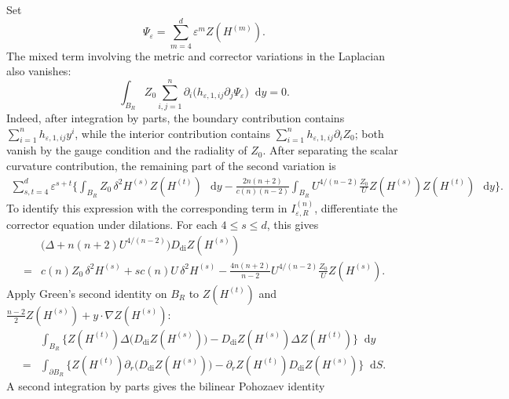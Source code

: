 \documentclass[11pt]{article}
\numberwithin{equation}{section}
\theoremstyle{remark}
\newcommand{\dd}{\mathop{}\!\mathrm{d}}
\begin{document}
 Set
 {
\[
 \Psi_\varepsilon=\sum_{m=4}^d
 \varepsilon^m Z(H^{(m)}).
\]
}
The mixed term involving the metric and corrector
variations in the Laplacian also vanishes:
{
\begin{equation*}
 \int_{B_R}Z_0\sum_{i,j=1}^n\partial_i
 \bigl(h_{\varepsilon,1,ij}\partial_j\Psi_\varepsilon\bigr)\dd y=0.
\end{equation*}
}
 Indeed, after integration by parts,
the boundary contribution contains
$\sum_{i=1}^nh_{\varepsilon,1,ij}y^i$, while the interior contribution
contains $\sum_{i=1}^nh_{\varepsilon,1,ij}\partial_iZ_0$; both vanish by
the gauge condition and the radiality of $Z_0$.  After separating the
scalar curvature contribution, the remaining part of the second
variation is
{
\begin{equation*}
\begin{aligned}
 \sum_{s,t=4}^d\varepsilon^{s+t}\biggl\{
 \int_{B_R}Z_0\,\delta^2H^{(s)}Z(H^{(t)})\,\dd y
 -\frac{2n(n+2)}{c(n)(n-2)}\int_{B_R}
       U^{4/(n-2)}\frac{Z_0}{U}Z(H^{(s)})Z(H^{(t)})\,\dd y\biggr\}.
\end{aligned}
\end{equation*}
}
To identify this expression with the corresponding
term in $I_{\varepsilon,R}^{(n)}$, differentiate the corrector equation under
dilations.  For each
$4\le s\le d$, this gives
{
\begin{equation*}
\begin{aligned}
 &\bigl(\Delta+n(n+2)U^{4/(n-2)}\bigr)
 D_{\mathrm{di}}Z(H^{(s)})\\
 {}={}&c(n)Z_0\,\delta^2H^{(s)}
 +s c(n)U\,\delta^2H^{(s)}
 -\frac{4n(n+2)}{n-2}U^{4/(n-2)}
       \frac{Z_0}{U}Z(H^{(s)}).
\end{aligned}
\end{equation*}
}
 Apply Green's second identity on $B_R$ to
$Z(H^{(t)})$ and
$\frac{n-2}{2}Z(H^{(s)})+y\mathbin{\cdot}\nabla Z(H^{(s)})$:
{
\begin{equation*}
\begin{aligned}
 &\int_{B_R}\biggl\{
 Z(H^{(t)})\Delta\bigl(D_{\mathrm{di}}Z(H^{(s)})\bigr)
 -D_{\mathrm{di}}Z(H^{(s)})
       \Delta Z(H^{(t)})\biggr\}\dd y\\
 {}={}&\int_{\partial B_R}\biggl\{
 Z(H^{(t)})\partial_r\bigl(D_{\mathrm{di}}Z(H^{(s)})\bigr)
 -\partial_r Z(H^{(t)})
       D_{\mathrm{di}}Z(H^{(s)})\biggr\}\dd S.
\end{aligned}
\end{equation*}
}
 A second integration by parts gives the bilinear Pohozaev identity
\end{document}
